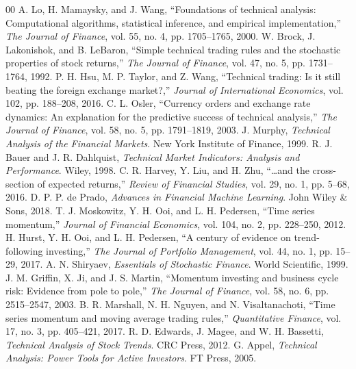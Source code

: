 \documentclass[conference]{IEEEtran}
\begin{document}
\begin{thebibliography}{00}
 A. Lo, H. Mamaysky, and J. Wang, ``Foundations of technical analysis: Computational algorithms, statistical inference, and empirical implementation,'' \textit{The Journal of Finance}, vol. 55, no. 4, pp. 1705--1765, 2000.
 W. Brock, J. Lakonishok, and B. LeBaron, ``Simple technical trading rules and the stochastic properties of stock returns,'' \textit{The Journal of Finance}, vol. 47, no. 5, pp. 1731--1764, 1992.
 P. H. Hsu, M. P. Taylor, and Z. Wang, ``Technical trading: Is it still beating the foreign exchange market?,'' \textit{Journal of International Economics}, vol. 102, pp. 188--208, 2016.
 C. L. Osler, ``Currency orders and exchange rate dynamics: An explanation for the predictive success of technical analysis,'' \textit{The Journal of Finance}, vol. 58, no. 5, pp. 1791--1819, 2003.
 J. Murphy, \textit{Technical Analysis of the Financial Markets}. New York Institute of Finance, 1999.
 R. J. Bauer and J. R. Dahlquist, \textit{Technical Market Indicators: Analysis and Performance}. Wiley, 1998.
 C. R. Harvey, Y. Liu, and H. Zhu, ``\ldots and the cross-section of expected returns,'' \textit{Review of Financial Studies}, vol. 29, no. 1, pp. 5--68, 2016.
 D. P. P. de Prado, \textit{Advances in Financial Machine Learning}. John Wiley \& Sons, 2018.
 T. J. Moskowitz, Y. H. Ooi, and L. H. Pedersen, ``Time series momentum,'' \textit{Journal of Financial Economics}, vol. 104, no. 2, pp. 228--250, 2012.
 H. Hurst, Y. H. Ooi, and L. H. Pedersen, ``A century of evidence on trend-following investing,'' \textit{The Journal of Portfolio Management}, vol. 44, no. 1, pp. 15--29, 2017.
 A. N. Shiryaev, \textit{Essentials of Stochastic Finance}. World Scientific, 1999.
 J. M. Griffin, X. Ji, and J. S. Martin, ``Momentum investing and business cycle risk: Evidence from pole to pole,'' \textit{The Journal of Finance}, vol. 58, no. 6, pp. 2515--2547, 2003.
 B. R. Marshall, N. H. Nguyen, and N. Visaltanachoti, ``Time series momentum and moving average trading rules,'' \textit{Quantitative Finance}, vol. 17, no. 3, pp. 405--421, 2017.
 R. D. Edwards, J. Magee, and W. H. Bassetti, \textit{Technical Analysis of Stock Trends}. CRC Press, 2012.
 G. Appel, \textit{Technical Analysis: Power Tools for Active Investors}. FT Press, 2005.

\end{thebibliography}
\end{document}
